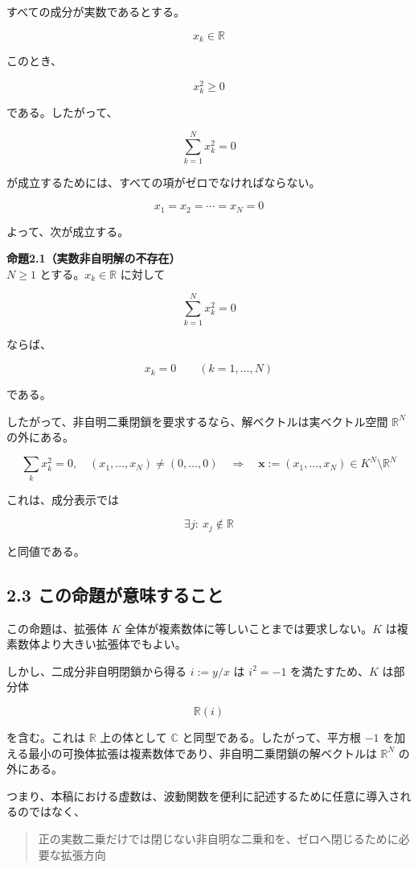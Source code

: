 \documentclass[
  a4paper,
  10pt]{article}
\begin{document}
すべての成分が実数であるとする。

\[
x_k\in\mathbb R
\]

このとき、

\[
x_k^2\ge0
\]

である。したがって、

\[
\sum_{k=1}^{N}x_k^2=0
\]

が成立するためには、すべての項がゼロでなければならない。

\[
x_1=x_2=\cdots=x_N=0
\]

よって、次が成立する。

\textbf{命題2.1（実数非自明解の不存在）}\\
\(N\ge1\) とする。\(x_k\in\mathbb R\) に対して

\[
\sum_{k=1}^{N}x_k^2=0
\]

ならば、

\[
x_k=0
\qquad(k=1,\ldots,N)
\]

である。

したがって、非自明二乗閉鎖を要求するなら、解ベクトルは実ベクトル空間
\(\mathbb R^N\) の外にある。

\[
\boxed{
\sum_kx_k^2=0,
\quad
(x_1,\ldots,x_N)\neq(0,\ldots,0)
\quad\Longrightarrow\quad
\mathbf{x}:=(x_1,\ldots,x_N)\in K^N\setminus\mathbb R^N
}
\]

これは、成分表示では

\[
\boxed{
\exists j:\ x_j\notin\mathbb R
}
\]

と同値である。

\subsection{2.3
この命題が意味すること}\label{23-ux3053ux306eux547dux984cux304cux610fux5473ux3059ux308bux3053ux3068}

この命題は、拡張体 \(K\)
全体が複素数体に等しいことまでは要求しない。\(K\)
は複素数体より大きい拡張体でもよい。

しかし、二成分非自明閉鎖から得る \(i:=y/x\) は \(i^2=-1\)
を満たすため、\(K\) は部分体

\[
\mathbb R(i)
\]

を含む。これは \(\mathbb R\) 上の体として \(\mathbb C\)
と同型である。したがって、平方根 \(-1\)
を加える最小の可換体拡張は複素数体であり、非自明二乗閉鎖の解ベクトルは
\(\mathbb R^N\) の外にある。

つまり、本稿における虚数は、波動関数を便利に記述するために任意に導入されるのではなく、

\begin{quote}
正の実数二乗だけでは閉じない非自明な二乗和を、ゼロへ閉じるために必要な拡張方向
\end{quote}
\end{document}
